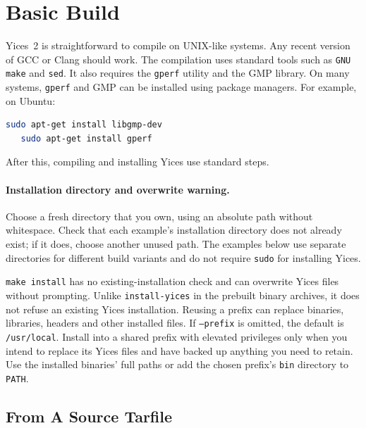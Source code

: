 \documentclass[11pt,twoside,fleqn,openright,titlepage]{cslreport}
\begin{document}
\section{Basic Build}
\label{source-install}

Yices~2 is straightforward to compile on UNIX-like systems. Any recent
version of GCC or Clang should work. The compilation uses standard
tools such as \texttt{GNU make} and \texttt{sed}. It also requires the
\texttt{gperf} utility and the GMP library. On many systems,
\texttt{gperf} and GMP can be installed using package
managers.  For example, on Ubuntu:
\begin{small}
\begin{lstlisting}[language=sh]
   sudo apt-get install libgmp-dev
   sudo apt-get install gperf
\end{lstlisting}
\end{small}
After this, compiling and installing Yices use standard steps.

\paragraph{Installation directory and overwrite warning.}
Choose a fresh directory that you own, using an absolute path without
whitespace. Check that each example's installation directory does not
already exist; if it does, choose another unused path. The examples below
use separate directories for different build variants and do not require
\texttt{sudo} for installing Yices.

\texttt{make install} has no existing-installation check and can overwrite
Yices files without prompting. Unlike \texttt{install-yices} in the
prebuilt binary archives, it does not refuse an existing Yices installation.
Reusing a prefix can replace binaries, libraries, headers and other
installed files. If \texttt{--prefix} is omitted, the default is
\texttt{/usr/local}. Install into a shared prefix with elevated privileges
only when you intend to replace its Yices files and have backed up anything
you need to retain. Use the installed binaries' full paths or add the
chosen prefix's \texttt{bin} directory to \texttt{PATH}.

\subsection*{From A Source Tarfile}
\end{document}
